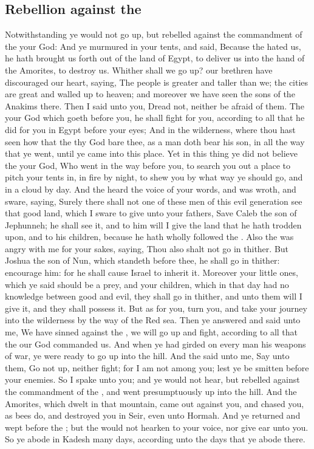 \begin{biblechapter}
\section*{Rebellion against the \LORD}
\verse Notwithstanding ye would not go up, but rebelled against the commandment of the \LORD your God:
\verse And ye murmured in your tents, and said, Because the \LORD hated us, he hath brought us forth out of the land of Egypt, to deliver us into the hand of the Amorites, to destroy us.
\verse Whither shall we go up? our brethren have discouraged our heart, saying, The people is greater and taller than we; the cities are great and walled up to heaven; and moreover we have seen the sons of the Anakims there.
\verse Then I said unto you, Dread not, neither be afraid of them.
\verse The \LORD your God which goeth before you, he shall fight for you, according to all that he did for you in Egypt before your eyes;
\verse And in the wilderness, where thou hast seen how that the \LORD thy God bare thee, as a man doth bear his son, in all the way that ye went, until ye came into this place.
\verse Yet in this thing ye did not believe the \LORD your God,
\verse Who went in the way before you, to search you out a place to pitch your tents in, in fire by night, to shew you by what way ye should go, and in a cloud by day.
\verse And the \LORD heard the voice of your words, and was wroth, and sware, saying,
\verse Surely there shall not one of these men of this evil generation see that good land, which I sware to give unto your fathers,
\verse Save Caleb the son of Jephunneh; he shall see it, and to him will I give the land that he hath trodden upon, and to his children, because he hath wholly followed the \LORD.
\verse Also the \LORD was angry with me for your sakes, saying, Thou also shalt not go in thither.
\verse But Joshua the son of Nun, which standeth before thee, he shall go in thither: encourage him: for he shall cause Israel to inherit it.
\verse Moreover your little ones, which ye said should be a prey, and your children, which in that day had no knowledge between good and evil, they shall go in thither, and unto them will I give it, and they shall possess it.
\verse But as for you, turn you, and take your journey into the wilderness by the way of the Red sea.
\verse Then ye answered and said unto me, We have sinned against the \LORD, we will go up and fight, according to all that the \LORD our God commanded us. And when ye had girded on every man his weapons of war, ye were ready to go up into the hill.
\verse And the \LORD said unto me, Say unto them, Go not up, neither fight; for I am not among you; lest ye be smitten before your enemies.
\verse So I spake unto you; and ye would not hear, but rebelled against the commandment of the \LORD, and went presumptuously up into the hill.
\verse And the Amorites, which dwelt in that mountain, came out against you, and chased you, as bees do, and destroyed you in Seir, even unto Hormah.
\verse And ye returned and wept before the \LORD; but the \LORD would not hearken to your voice, nor give ear unto you.
\verse So ye abode in Kadesh many days, according unto the days that ye abode there.
\end{biblechapter}

